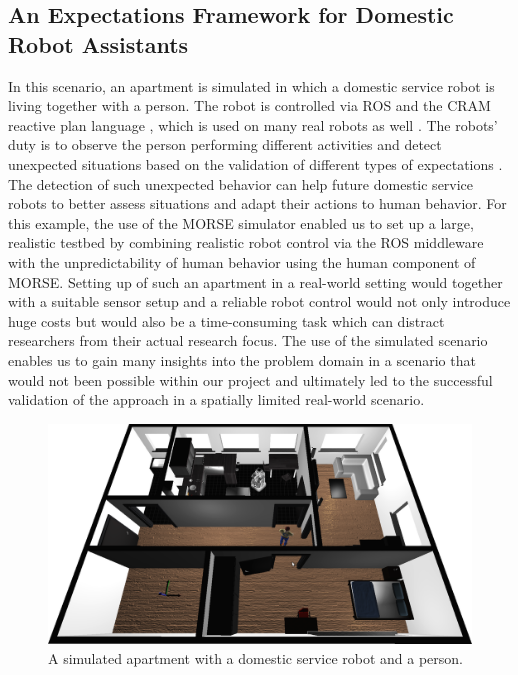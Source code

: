 \documentclass[conference]{IEEEtran}
\begin{document}
\subsection{An Expectations Framework for Domestic Robot Assistants}
\label{scenario2}

In this scenario, an apartment is simulated in which a domestic service robot is living together with a person. The robot is controlled via ROS and the CRAM reactive plan language \cite{beetz2010cram}, which is used on many real robots as well \cite{pancakes11humanoids}. The robots' duty is to observe the person performing different activities and detect unexpected situations based on the validation of different types of expectations \cite{Karg2013}. The detection of such unexpected behavior can help future domestic service robots to better assess situations and adapt their actions to human behavior. For this example, the use of the MORSE simulator enabled us to set up a large, realistic testbed by combining realistic robot control via the ROS middleware with the unpredictability of human behavior using the human component of MORSE. Setting up of such an apartment in a real-world setting would together with a suitable sensor setup and a reliable robot control would not only introduce huge costs but would also be a time-consuming task which can distract researchers from their actual research focus. The use of the simulated scenario enables us to gain many insights into the problem domain in a scenario that would not been possible within our project and ultimately led to the successful validation of the approach in a spatially limited real-world scenario.

\begin{figure}[H]
      \centering
      \includegraphics[width=0.9\linewidth]{morse_apartment.png}
      \caption{A simulated apartment with a domestic service robot and a person.}
      \label{fig|apartment}
\end{figure}
\end{document}
